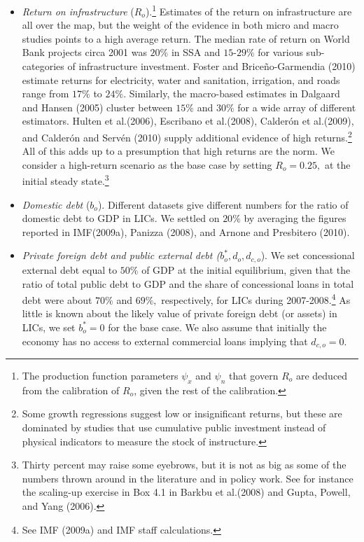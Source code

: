 \documentclass[11pt]{article}
\begin{document}
\begin{itemize}
\item \textit{Return on infrastructure }($R_{o}$).\footnote{%
The production function parameters $\psi _{x}$ and $\psi _{n}$ that govern $%
R_{o}$ are deduced from the calibration of $R_{o}$, given the rest of the
calibration.} Estimates of the return on infrastructure are all over the
map, but the weight of the evidence in both micro and macro studies points
to a high average return. The median rate of return on World Bank projects
circa 2001 was $20\%$ in SSA and $15$-$29\%$ for various sub-categories of
infrastructure investment. Foster and Brice\~{n}o-Garmendia (2010) estimate
returns for electricity, water and sanitation, irrigation, and roads range
from $17\%$ to $24\%.$ Similarly, the macro-based estimates in Dalgaard and
Hansen (2005) cluster between $15\%$ and $30\%$ for a wide array of
different estimators. Hulten et al.\thinspace (2006), Escribano et
al.\thinspace (2008), Calder\'{o}n et al.\thinspace (2009), and Calder\'{o}n
and Serv\'{e}n (2010) supply additional evidence of high returns.\footnote{%
Some growth regressions suggest low or insignificant returns, but these are
dominated by studies that use cumulative public investment instead of
physical indicators to measure the stock of instructure.} All of this adds
up to a presumption that high returns are the norm. We consider a
high-return scenario as the base case by setting $R_{o}=0.25,$ at the
initial steady state.\footnote{%
Thirty percent may raise some eyebrows, but it is not as big as some of the
numbers thrown around in the literature and in policy work. See for instance
the scaling-up exercise in Box 4.1 in Barkbu et al.\thinspace (2008) and
Gupta, Powell, and Yang (2006).}

\item \textit{Domestic debt }($b_{o}$). Different datasets give different
numbers for the ratio of domestic debt to GDP in LICs. We settled on $20\%$
by averaging the figures reported in IMF(2009a), Panizza (2008), and Arnone
and Presbitero (2010).

\item \textit{Private foreign debt and public external debt (}$b_{o}^{\ast
},d_{o},d_{c,o}$). We set concessional external debt equal to $50\%$ of GDP
at the initial equilibrium, given that the ratio of total public debt to GDP
and the share of concessional loans in total debt were about $70\%$ and $%
69\%,$ respectively, for LICs during 2007-2008.\footnote{%
See IMF (2009a) and IMF staff calculations.} As little is known about the
likely value of private foreign debt (or assets) in LICs, we set $%
b_{o}^{\ast }=0$ for the base case. We also assume that initially the
economy has no access to external commercial loans implying that $d_{c,o}=0.$


\end{itemize}
\end{document}
